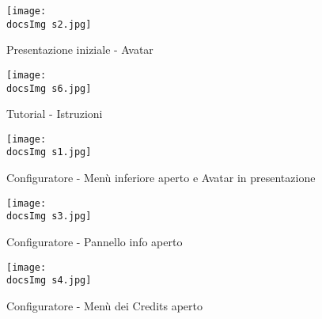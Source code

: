 	\begin{figure}[H]
		\centering
		\texttt{[image: \\docsImg s2.jpg]}
		\caption{Presentazione iniziale - Avatar}
		\label{fig:Presentazione iniziale - Avatar}
	\end{figure}
		
	\begin{figure}[H]
		\centering
		\texttt{[image: \\docsImg s6.jpg]}
		\caption{Tutorial - Istruzioni}
		\label{fig:Tutorial - Istruzioni}
	\end{figure}	
	
	\begin{figure}[H]
		\centering
		\texttt{[image: \\docsImg s1.jpg]}
		\caption{Configuratore - Men\`u inferiore aperto e Avatar in presentazione}
		\label{fig:Configuratore - Menu' inferiore aperto e Avatar in presentazione}
	\end{figure}
	
	\begin{figure}[H]
		\centering
		\texttt{[image: \\docsImg s3.jpg]}
		\caption{Configuratore - Pannello info aperto}
		\label{fig:Configuratore - Pannello info aperto}
	\end{figure}
		
	\begin{figure}[H]
		\centering
		\texttt{[image: \\docsImg s4.jpg]}
		\caption{Configuratore - Men\`u dei Credits aperto}
		\label{fig:Configuratore - Menu' dei Credits aperto}
	\end{figure}